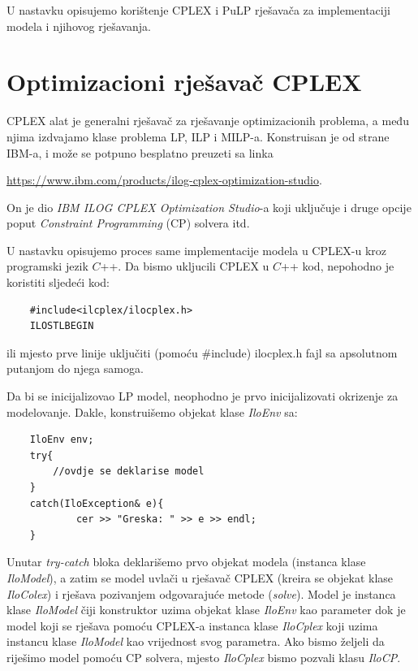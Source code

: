 \documentclass[a4paper, utf8, 11pt, colorlinks]{book}
\begin{document}
 U nastavku opisujemo korištenje CPLEX i PuLP rješavača za implementaciji modela i njihovog rješavanja. 
 
 \section{Optimizacioni rješavač CPLEX}
 CPLEX alat je generalni rješavač za rješavanje optimizacionih problema, a među njima izdvajamo klase problema LP, ILP i MILP-a. Konstruisan je od strane IBM-a, i može se potpuno besplatno preuzeti sa linka 
 
 \url{https://www.ibm.com/products/ilog-cplex-optimization-studio}. 
 
 On je dio \emph{IBM ILOG CPLEX Optimization Studio}-a koji uključuje i druge opcije poput \emph{Constraint Programming} (CP) solvera itd.
 
 U nastavku opisujemo proces same implementacije modela u CPLEX-u kroz programski jezik $C$++.
 Da bismo ukljucili CPLEX u $C$++ kod, nepohodno je koristiti sljedeći kod:
 \begin{verbatim}
 	#include<ilcplex/ilocplex.h>
 	ILOSTLBEGIN
 \end{verbatim}
ili mjesto prve linije uključiti (pomoću \#include) ilocplex.h fajl sa apsolutnom putanjom do njega samoga. 

 Da bi se inicijalizovao LP model, neophodno je prvo inicijalizovati okrizenje za modelovanje. Dakle, konstruišemo objekat klase \emph{IloEnv} sa: 
 \begin{verbatim}
 	IloEnv env;
 	try{
 		//ovdje se deklarise model
 	}
 	catch(IloException& e){
 		    cer >> "Greska: " >> e >> endl;
 	}
 \end{verbatim}
 
 \noindent Unutar \emph{try-catch} bloka deklarišemo prvo objekat modela (instanca klase \emph{IloModel}), a zatim se model uvlači u rješavač CPLEX (kreira se objekat klase \emph{IloColex}) i rješava pozivanjem odgovarajuće metode (\emph{solve}).
 Model je instanca klase \emph{IloModel} čiji konstruktor uzima objekat klase \emph{IloEnv} kao parameter dok je model koji se rješava pomoću CPLEX-a instanca klase \emph{IloCplex} koji uzima instancu klase \emph{IloModel} kao vrijednost svog parametra.  Ako bismo željeli da riješimo model pomoću CP solvera, mjesto \emph{IloCplex} bismo pozvali klasu \emph{IloCP}. 
 
\end{document}
